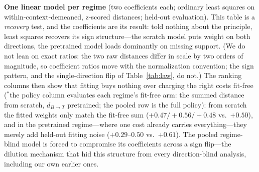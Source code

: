 \documentclass[runningheads]{llncs}
\newcommand{\dbt}{d_{B\to T}}
\begin{document}
\begin{table}[t]
\centering
\caption{\textbf{One linear model per regime} (two coefficients each;
ordinary least squares on within-context-demeaned, z-scored distances;
held-out evaluation). This table is a \emph{recovery} test, and the
coefficients are its result: told nothing about the principle, least squares
recovers its sign structure---the scratch model puts weight on both
directions, the pretrained model loads dominantly on missing support. (We do
not lean on exact ratios: the two raw distances differ in scale by two
orders of magnitude, so coefficient ratios move with the normalization
convention; the sign pattern, and the single-direction flip of
Table~\ref{tab:law}, do not.)
The ranking columns then show that fitting buys nothing over charging the
right costs fit-free ($^{*}$the policy column evaluates each regime's
fit-free arm: the summed distance from scratch, $\dbt$ pretrained; the
pooled row is the full policy): from scratch the fitted weights only match
the fit-free sum ($+0.47/+0.56/+0.48$ vs.\ $+0.50$), and in the pretrained
regime---where one cost already carries everything---they merely add
held-out fitting noise ($+0.29$--$0.50$ vs.\ $+0.61$). The pooled
regime-blind model is forced to compromise its coefficients across a sign
flip---the dilution mechanism that hid this structure from every
direction-blind analysis, including our own earlier ones.}
\label{tab:linear}
\small

\end{table}
\end{document}
